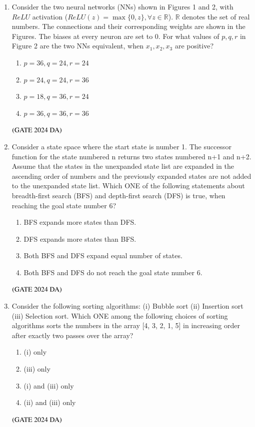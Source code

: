 \documentclass[journal,12pt,onecolumn]{IEEEtran}
\theoremstyle{remark}
\begin{document}
\begin{enumerate}[resume]
\item Consider the two neural networks (NNs) shown in Figures 1 and 2, with $ReLU$ activation ($ReLU(z) = \max\{0, z\}, \forall z \in \mathbb{R}$). $\mathbb{R}$ denotes the set of real numbers. The connections and their corresponding weights are shown in the Figures. The biases at every neuron are set to 0. For what values of $p, q, r$ in Figure 2 are the two NNs equivalent, when $x_1, x_2, x_3$ are positive?
\begin{multicols}{2}
\begin{enumerate}
\item $p = 36, q = 24, r = 24$
\item $p = 24, q = 24, r = 36$
\item $p = 18, q = 36, r = 24$
\item $p = 36, q = 36, r = 36$
\end{enumerate}
\end{multicols}
\hfill $\left(\text{GATE 2024 DA}\right)$


\item Consider a state space where the start state is number 1. The successor function for the state numbered n returns two states numbered n+1 and n+2. Assume that the states in the unexpanded state list are expanded in the ascending order of numbers and the previously expanded states are not added to the unexpanded state list. Which ONE of the following statements about breadth-first search (BFS) and depth-first search (DFS) is true, when reaching the goal state number 6?
\begin{enumerate}
\item BFS expands more states than DFS.
\item DFS expands more states than BFS.
\item Both BFS and DFS expand equal number of states.
\item Both BFS and DFS do not reach the goal state number 6.
\end{enumerate}
\hfill $\left(\text{GATE 2024 DA}\right)$


\item Consider the following sorting algorithms: (i) Bubble sort (ii) Insertion sort (iii) Selection sort. Which ONE among the following choices of sorting algorithms sorts the numbers in the array [4, 3, 2, 1, 5] in increasing order after exactly two passes over the array?
\begin{multicols}{4}
\begin{enumerate}
\item (i) only
\item (iii) only
\item (i) and (iii) only
\item (ii) and (iii) only
\end{enumerate}
\end{multicols}
\hfill $\left(\text{GATE 2024 DA}\right)$



\end{enumerate}
\end{document}
